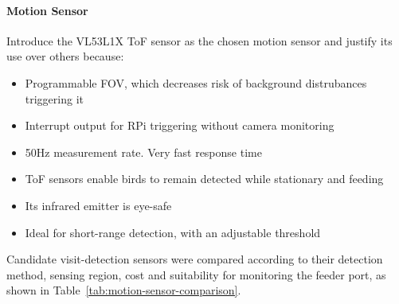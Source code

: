 \paragraph{Motion Sensor}
\par\vspace{6pt}
Introduce the VL53L1X ToF sensor as the chosen motion sensor and justify its use over others because:
\begin{itemize}
    \item Programmable FOV, which decreases risk of background distrubances triggering it
    \item Interrupt output for RPi triggering without camera monitoring
    \item 50Hz measurement rate. Very fast response time
    \item ToF sensors enable birds to remain detected while stationary and feeding
    \item Its infrared emitter is eye-safe
    \item Ideal for short-range detection, with an adjustable threshold
\end{itemize}

Candidate visit-detection sensors were compared according to their detection method, sensing region, cost and suitability for monitoring the feeder port, as shown in Table~\ref{tab:motion-sensor-comparison}.

